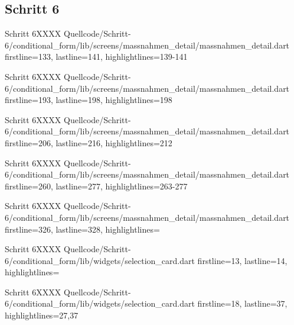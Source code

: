 \ifincludeall \clearpage \fi 


\subsection{Schritt 6}


  \begin{alexlisting}{Schritt 6}{XXXX}
    {Quellcode/Schritt-6/conditional_form/lib/screens/massnahmen_detail/massnahmen_detail.dart}
    {firstline=133, lastline=141, highlightlines={139-141}}
    \label{lst:Schritt6XXXXX}
  \end{alexlisting}

  \begin{alexlisting}{Schritt 6}{XXXX}
    {Quellcode/Schritt-6/conditional_form/lib/screens/massnahmen_detail/massnahmen_detail.dart}
    {firstline=193, lastline=198, highlightlines={198}}
    \label{lst:Schritt6XXXXX}
  \end{alexlisting}

  \begin{alexlisting}{Schritt 6}{XXXX}
    {Quellcode/Schritt-6/conditional_form/lib/screens/massnahmen_detail/massnahmen_detail.dart}
    {firstline=206, lastline=216, highlightlines={212}}
    \label{lst:Schritt6XXXXX}
  \end{alexlisting}

  \begin{alexlisting}{Schritt 6}{XXXX}
    {Quellcode/Schritt-6/conditional_form/lib/screens/massnahmen_detail/massnahmen_detail.dart}
    {firstline=260, lastline=277, highlightlines={263-277}}
    \label{lst:Schritt6XXXXX}
  \end{alexlisting}

  \begin{alexlisting}{Schritt 6}{XXXX}
    {Quellcode/Schritt-6/conditional_form/lib/screens/massnahmen_detail/massnahmen_detail.dart}
    {firstline=326, lastline=328, highlightlines={}}
    \label{lst:Schritt6XXXXX}
  \end{alexlisting}


  \begin{alexlisting}{Schritt 6}{XXXX}
    {Quellcode/Schritt-6/conditional_form/lib/widgets/selection_card.dart}
    {firstline=13, lastline=14, highlightlines={}}
    \label{lst:Schritt6XXXX}
\end{alexlisting}

\begin{alexlisting}{Schritt 6}{XXXX}
    {Quellcode/Schritt-6/conditional_form/lib/widgets/selection_card.dart}
    {firstline=18, lastline=37, highlightlines={27,37}}
    \label{lst:Schritt6XXXX}
\end{alexlisting}

